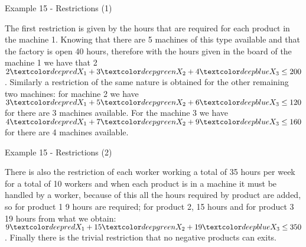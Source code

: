 \begin{frame}{Example 15 - Restrictions (1)}

The first restriction is given by the hours that are required for each product
in the machine 1. Knowing that there are 5 machines of this type available and
that the factory is open 40 hours, therefore with the hours given in the board
of the machine 1 we have that 2
$2\colora{X_1} +  3\colorb{X_2} +  4\colorc{X_3} \le 200$. Similarly a
restriction of the same nature is obtained for the other remaining two machines:
for machine 2 we have $3\colora{X_1} +  5\colorb{X_2} +  6\colorc{X_3} \le 120$
for there are 3 machines available. For the machine 3 we have
$4\colora{X_1} +  7\colorb{X_2} +  9\colorc{X_3} \le 160$
for there are 4 machines available.

\end{frame}


\begin{frame}{Example 15 - Restrictions (2)}

There is also the restriction of each worker working a total of 35 hours per
week for a total of 10 workers and when each product is in a machine it must be
handled by a worker, because of this all the hours required by product are
added, so for product 1 9 hours are required; for product 2, 15 hours and for
product 3 19 hours from what we obtain:
$9\colora{X_1} + 15\colorb{X_2} + 19\colorc{X_3} \le 350$. Finally there is the
trivial restriction that no negative products can exits.

\end{frame}
